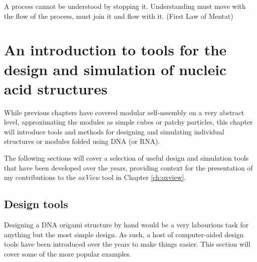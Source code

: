 \begin{savequote}[8cm]
A process cannot be understood by stopping it. Understanding must move with the flow of the process, must join it and flow with it. (First Law of Mentat)
\end{savequote}

\chapter{An introduction to tools for the design and simulation of nucleic acid structures}\label{sec:toolsForIndMod}

\minitoc

While previous chapters have covered modular self-assembly on a very abstract level, approximating the modules as simple cubes or patchy particles, this chapter will introduce tools and methods for designing and simulating individual structures or modules folded using DNA (or RNA).

The following sections will cover a selection of useful design and simulation tools that have been developed over the years, providing context for the presentation of my contributions to the \emph{oxView} tool in Chapter \ref{ch:oxview}.







\section{Design tools}\label{sec:design_tools}
Designing a DNA origami structure by hand would be a very labourious task for anything but the most simple design. As such, a host of computer-aided design tools have been introduced over the years to make things easier. This section will cover some of the more popular examples.

